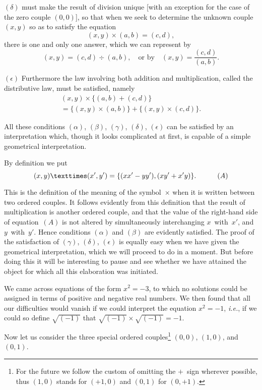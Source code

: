 \documentclass[12pt,leqno]{book}[2005/09/16]
\newcommand{\Chg}[2]{#2}
\newcommand{\Add}[1]{\Chg{}{#1}}
\newcommand{\PageSep}[1]{\ignorespaces}
\newcommand{\ie}{\emph{i.e.}}
\newcommand{\Tag}[1]{\tag*{\quad\ensuremath{#1}}}
\newcommand{\Eq}[1]{\ensuremath{#1}}
\begin{document}
\Eq{(\delta)} must make the result of division unique
[with an exception for the case of the zero
couple $(0, 0)$], so that when we seek to determine
the unknown couple $(x, y)$ so as to
satisfy the equation
\[
(x, y) × (a, b) = (c, d),
\]
there is one and only one answer, which we
can represent by
\[
(x, y) = (c, d) ÷ (a, b),\quad\text{or by}\quad
(x, y) = \frac{(c, d)}{(a, b)}\Add{.}
\]
\PageSep{102}

\Eq{(\epsilon)} Furthermore the law involving both
addition and multiplication, called the distributive
law, must be satisfied, namely
\begin{multline*}
(x,y) × \{(a, b) + (c, d)\} \\
= \{(x, y) × (a, b)\} + \{(x, y) × (c, d)\}.
\end{multline*}

All these conditions \Eq{(\alpha)}, \Eq{(\beta)}, \Eq{(\gamma)}, \Eq{(\delta)}, \Eq{(\epsilon)} can
be satisfied by an interpretation which,
though it looks complicated at first, is capable
of a simple geometrical interpretation.

By definition we put
\[
(x, y) × (x', y') = \{(xx' - yy'), (xy' + x'y)\}\Add{.}
\Tag{(A)}
\]

This is the definition of the meaning of the
symbol~$×$ when it is written between two
ordered couples. It follows evidently from
this definition that the result of multiplication
is another ordered couple, and that the
value of the right-hand side of equation~\Eq{(A)}
is not altered by simultaneously interchanging
$x$~with~$x'$, and $y$~with~$y'$. Hence conditions
\Eq{(\alpha)} and \Eq{(\beta)} are evidently satisfied. The proof
of the satisfaction of \Eq{(\gamma)}, \Eq{(\delta)}, \Eq{(\epsilon)} is equally
easy when we have given the geometrical
interpretation, which we will proceed to do
in a moment. But before doing this it will
be interesting to pause and see whether we
have attained the object for which all this
elaboration was initiated.

We came across equations of the form
$x^{2} = -3$, to which no solutions could be
\PageSep{103}
assigned in terms of positive and negative real
numbers. We then found that all our difficulties
would vanish if we could interpret the
equation $x^{2} = -1$, \ie, if we could so define
$\sqrt{(-1)}$ that $\sqrt{(-1)} × \sqrt{(-1)} = -1$.

Now let us consider the three special
%
ordered couples\footnote
  {For the future we follow the custom of omitting the
  $+$~sign wherever possible, thus $(1, 0)$ stands for $(+1, 0)$
  and $(0, 1)$ for $(0, +1)$.}
$(0, 0)$, $(1, 0)$, and $(0, 1)$.
\end{document}
